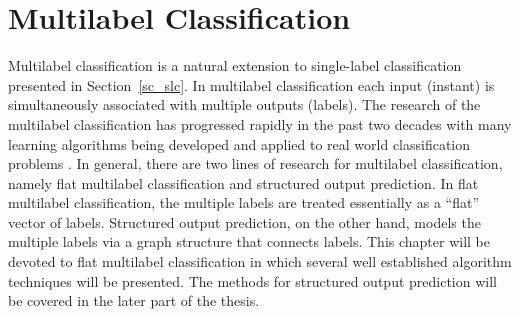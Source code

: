 {




%
%
\chapter{Multilabel Classification} \label{ch_fmlc}

Multilabel classification is a natural extension to single-label classification presented in Section~\ref{sc_slc}.
In multilabel classification each input (instant) is simultaneously associated with multiple outputs (labels).
The research of the multilabel classification has progressed rapidly in the past two decades with many learning algorithms being developed and applied to real world classification problems \citep{lafferty01,taskar02,Taskar04max,THJA04,Rousu07}.
In general, there are two lines of research for multilabel classification, namely flat multilabel classification and structured output prediction.
In flat multilabel classification, the multiple labels are treated essentially as a ``flat'' vector of labels.
Structured output prediction, on the other hand, models the multiple labels via a graph structure that connects labels.
This chapter will be devoted to flat multilabel classification in which several well established algorithm techniques will be presented.
The methods for structured output prediction will be covered in the later part of the thesis.

}

